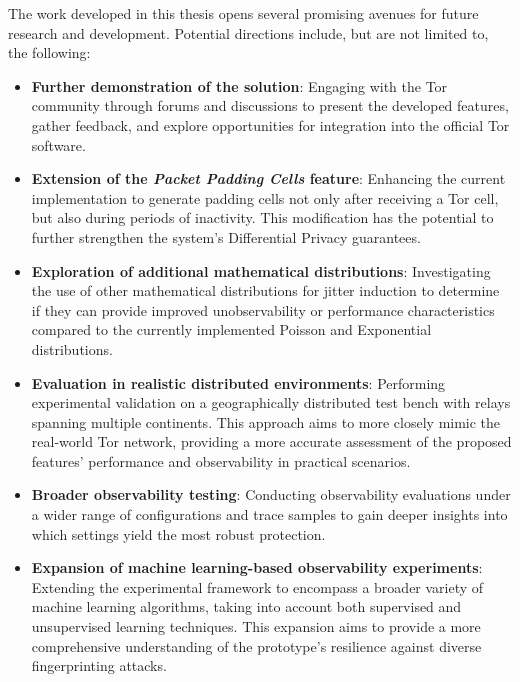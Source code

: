 The work developed in this thesis opens several promising avenues for future research and development. Potential directions include, but are not limited to, the following:
\begin{itemize}
    \item \textbf{Further demonstration of the solution}: Engaging with the Tor community through forums and discussions to present the developed features, gather feedback, and explore opportunities for integration into the official Tor software.
    \item \textbf{Extension of the \textit{Packet Padding Cells} feature}: Enhancing the current implementation to generate padding cells not only after receiving a Tor cell, but also during periods of inactivity. This modification has the potential to further strengthen the system's Differential Privacy guarantees.
    \item \textbf{Exploration of additional mathematical distributions}: Investigating the use of other mathematical distributions for jitter induction to determine if they can provide improved unobservability or performance characteristics compared to the currently implemented Poisson and Exponential distributions.
    \item \textbf{Evaluation in realistic distributed environments}: Performing experimental validation on a geographically distributed test bench with relays spanning multiple continents. This approach aims to more closely mimic the real-world Tor network, providing a more accurate assessment of the proposed features' performance and observability in practical scenarios.
    \item \textbf{Broader observability testing}: Conducting observability evaluations under a wider range of configurations and trace samples to gain deeper insights into which settings yield the most robust protection.
    \item \textbf{Expansion of machine learning-based observability experiments}: Extending the experimental framework to encompass a broader variety of machine learning algorithms, taking into account both supervised and unsupervised learning techniques. This expansion aims to provide a more comprehensive understanding of the prototype's resilience against diverse fingerprinting attacks.
\end{itemize}